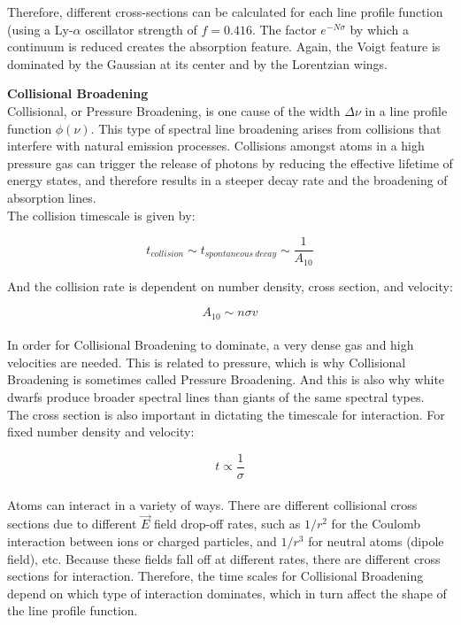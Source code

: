 \documentclass{article}
\begin{document}
Therefore, different cross-sections can be calculated for each line profile function (using a Ly-$\alpha$ oscillator strength of $f=0.416$. The factor $e^{-N\sigma}$ by which a continuum is reduced creates the absorption feature. Again, the Voigt feature is dominated by the Gaussian at its center and by the Lorentzian wings.


\textbf{Collisional Broadening}\\

Collisional, or Pressure Broadening, is one cause of the width $\Delta\nu$ in a line profile function $\phi(\nu)$. This type of spectral line broadening arises from collisions that interfere with natural emission processes. Collisions amongst atoms in a high pressure gas can trigger the release of photons by reducing the effective lifetime of energy states, and therefore results in a steeper decay rate and the broadening of absorption lines. \\

The collision timescale is given by:

$$t_{collision} \sim t_{spontaneous\ decay} \sim {\frac{1}{A_{10}}} $$

And the collision rate is dependent on number density, cross section, and velocity:

$$A_{10} \sim n\sigma v$$ \\

In order for Collisional Broadening to dominate, a very dense gas and high velocities are needed. This is related to pressure, which is why Collisional Broadening is sometimes called Pressure Broadening. And this is also why white dwarfs produce broader spectral lines than giants of the same spectral types. \\

The cross section is also important in dictating the timescale for interaction. For fixed number density and velocity: 

$$t \propto {\frac{1}{\sigma}}$$ \\

Atoms can interact in a variety of ways. There are different collisional cross sections due to different $\vec{E}$ field drop-off rates, such as $1/r^{2}$ for the Coulomb interaction between ions or charged particles, and $1/r^{3}$ for neutral atoms (dipole field), etc. Because these fields fall off at different rates, there are different cross sections for interaction. Therefore, the time scales for Collisional Broadening depend on which type of interaction dominates, which in turn affect the shape of the line profile function. \\
\end{document}
